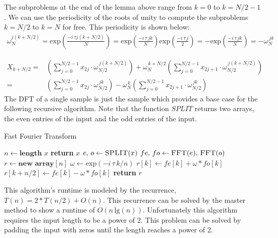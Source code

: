 \documentclass[fleqn]{article}
\newcommand{\expF}[1]{\ensuremath{\text{exp}\left(#1\right)}}
\begin{document}
The subproblems at the end of the lemma above range from $k = 0$ to $k = N / 2 -
1$. We can use the periodicity of the roots of unity to compute the subproblems $k = N / 2$ to
$k = N$ for free. This periodicity is shown below:
\begin{align*}
  \omega_{N}^{j \left( k + N / 2 \right)}
  = \expF{\frac{- i \, \tau j \left( k + N / 2 \right)}{N}}
  = \expF{\frac{- i \, \tau \, j k}{N}} \expF{\frac{- i \, \tau \, j}{2}}
  = - \expF{\frac{- i \, \tau \, j k}{N}} = - \omega_{N}^{\, j k}
\end{align*}

\begin{align*}
  X_{k + N / 2}
  =& \left( \sum_{j = 0}^{N / 2 - 1} x_{2 j} \cdot \omega_{N / 2}^{\, j \left( k + N / 2 \right)} \right)
   + \omega_N^{\, k + N / 2} \left( \sum_{j = 0}^{N / 2 - 1} x_{2 j + 1} \cdot \omega_{N / 2}^{\, j \left( k + N / 2 \right)} \right) \\
  =& \left( \sum_{j = 0}^{N / 2 - 1} x_{2 j} \cdot \omega_{N / 2}^{\, j k} \right)
   - \omega_N^{\, k} \left( \sum_{j = 0}^{N / 2 - 1} x_{2 j + 1} \cdot \omega_{N / 2}^{\, j k} \right)
\end{align*}
The DFT of a single sample is just the sample which provides a base case for the
following recursive algorithm. Note that the function $SPLIT$ returns
two arrays, the even entries of the input and the odd entries of the input.
\begin{algorithm}[H]
  \caption{Fast Fourier Transform}\label{euclid}
  \begin{algorithmic}
    \State $n \leftarrow \textbf{length } x$
      \State \textbf{return} $x$
    \EndIf
    \State $e ,\, o \leftarrow \Call{SPLIT}{x}$
    \State $fe ,\, fo \leftarrow \Call{FFT}{e} ,\, \Call{FFT}{o}$
    \State $r \leftarrow \textbf{new array}[n]$
      \State $\omega \leftarrow \expF{- i \, \tau \, k / n}$
      \State $r[k] \leftarrow fe[k] + \omega * fo[k]$
      \State $r[k + n / 2] \leftarrow fe[k] - \omega * fo[k]$
    \EndFor
    \State \textbf{return} $r$
    \EndFunction
  \end{algorithmic}
\end{algorithm}

This algorithm's runtime is modeled by the recurrence, $T(n) = 2 * T(n / 2) +
O(n)$. This recurrence can be solved by the master method to show a runtime of
$O(n \, \text{lg}(n))$. Unfortunately this algorithm requires the input length
to be a power of 2. This problem can be solved by padding the input with zeros
until the length reaches a power of 2.
\end{document}
